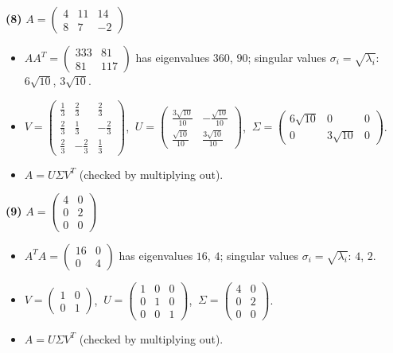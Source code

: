 \noindent\textbf{(8)} $A=\begin{pmatrix}4 & 11 & 14 \\ 8 & 7 & -2\end{pmatrix}$
\begin{itemize}\item $AA^T=\begin{pmatrix}333 & 81 \\ 81 & 117\end{pmatrix}$ has eigenvalues $360$, $90$; singular values $\sigma_i=\sqrt{\lambda_i}$: $6 \sqrt{10}$, $3 \sqrt{10}$.
\item $V=\begin{pmatrix}\frac{1}{3} & \frac{2}{3} & \frac{2}{3} \\ \frac{2}{3} & \frac{1}{3} & - \frac{2}{3} \\ \frac{2}{3} & - \frac{2}{3} & \frac{1}{3}\end{pmatrix}$, $\ U=\begin{pmatrix}\frac{3 \sqrt{10}}{10} & - \frac{\sqrt{10}}{10} \\ \frac{\sqrt{10}}{10} & \frac{3 \sqrt{10}}{10}\end{pmatrix}$, $\ \Sigma=\begin{pmatrix}6 \sqrt{10} & 0 & 0 \\ 0 & 3 \sqrt{10} & 0\end{pmatrix}$.
\item $A=U\Sigma V^T$ (checked by multiplying out).\end{itemize}

\noindent\textbf{(9)} $A=\begin{pmatrix}4 & 0 \\ 0 & 2 \\ 0 & 0\end{pmatrix}$
\begin{itemize}\item $A^TA=\begin{pmatrix}16 & 0 \\ 0 & 4\end{pmatrix}$ has eigenvalues $16$, $4$; singular values $\sigma_i=\sqrt{\lambda_i}$: $4$, $2$.
\item $V=\begin{pmatrix}1 & 0 \\ 0 & 1\end{pmatrix}$, $\ U=\begin{pmatrix}1 & 0 & 0 \\ 0 & 1 & 0 \\ 0 & 0 & 1\end{pmatrix}$, $\ \Sigma=\begin{pmatrix}4 & 0 \\ 0 & 2 \\ 0 & 0\end{pmatrix}$.
\item $A=U\Sigma V^T$ (checked by multiplying out).\end{itemize}

